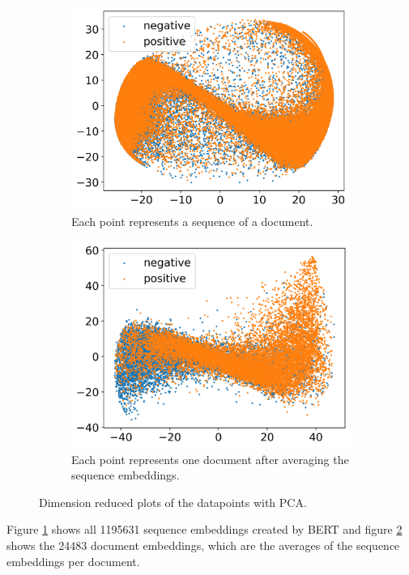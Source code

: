 \begin{figure}[h]
    \begin{subfigure}{0.5\textwidth}
        \centering
        \includegraphics[width=\textwidth]{figures/pca_scatter_sequence_level.png}
        \caption{Each point represents a sequence of a document.}
        \label{figure:pca_sequence}
    \end{subfigure}
    \begin{subfigure}{0.5\textwidth}
        \centering
        \includegraphics[width=\textwidth]{figures/pca_scatter_document_level.png}
        \caption{Each point represents one document after averaging the sequence embeddings.}
        \label{figure:pca_document}
    \end{subfigure}
    \caption{Dimension reduced plots of the datapoints with \ac{PCA}.}
    \label{figure:pca}
\end{figure}
Figure \ref{figure:pca_sequence} shows all 1195631 sequence embeddings created by \ac{BERT} and figure \ref{figure:pca_document} shows the 24483 document embeddings, which are the averages of the sequence embeddings per document.

